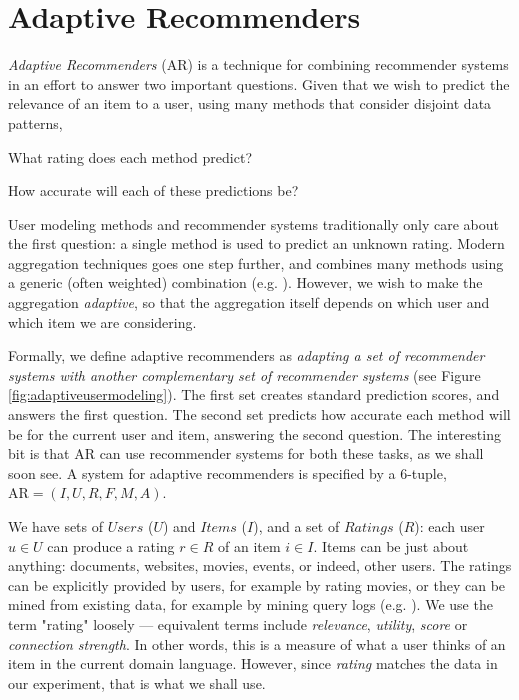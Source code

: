 \section{Adaptive Recommenders}
\label{sec:adaptive}

\emph{Adaptive Recommenders} (AR) is a technique for combining recommender systems
in an effort to answer two important questions.
Given that we wish to predict the relevance of an item to a user,
using many methods that consider disjoint data patterns,

\begin{enumerate*}
  \item What rating does each method predict?
  \item How accurate will each of these predictions be?
\end{enumerate*}

User modeling methods and recommender systems traditionally only care about the first question:
a single method is used to predict an unknown rating.
Modern aggregation techniques goes one step further, and combines many methods using a generic (often weighted) combination
(e.g. \cite{Bell2007b, Huang2002}).
However, we wish to make the aggregation \emph{adaptive},
so that the aggregation itself depends on which user and which item we are considering.

Formally, we define adaptive recommenders as \emph{adapting a set of recommender systems
with another complementary set of recommender systems} 
(see Figure \ref{fig:adaptiveusermodeling}).
The first set creates standard prediction scores, and answers the first question.
The second set predicts how accurate each method will be for the current user and item,
answering the second question.
The interesting bit is that AR can use recommender systems for both these tasks, as we shall soon see.
A system for adaptive recommenders is specified by a 6-tuple, 
$\mathrm{AR} = (I,U,R,F,M,A)$.

We have sets of $Users$ ($U$) and $Items$ ($I$), 
and a set of $Ratings$ ($R$): each user $u \in U$ can produce a rating $r \in R$ of an item $i \in I$.
Items can be just about anything: documents, websites, movies, events, or indeed, other users.
The ratings can be explicitly provided by users, for example by rating movies,
or they can be mined from existing data, for example by mining query logs
(e.g. \cite{Liu2002, Sugiyama2004, Shen2005, Speretta2000}).
We use the term "rating" loosely --- equivalent terms include \emph{relevance}, \emph{utility},
\emph{score} or \emph{connection strength}. In other words, this is a measure of what a user thinks of an item
in the current domain language. However, since \emph{rating} 
matches the data in our experiment, that is what we shall use.

